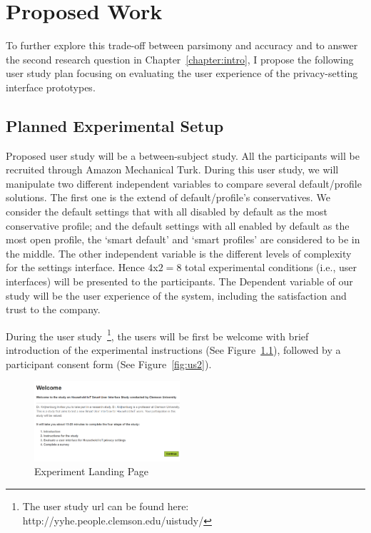 \chapter{Proposed Work}\label{chapter:evaluation}

To further explore this trade-off between parsimony and accuracy and to answer the second research question in Chapter~\ref{chapter:intro}, I propose the following user study plan focusing on evaluating the user experience of the privacy-setting interface prototypes.

\section{Planned Experimental Setup}
Proposed user study will be a between-subject study. All the participants will be recruited through Amazon Mechanical Turk. During this user study, we will manipulate two different independent variables to compare several default/profile solutions. The first one is the extend of default/profile's conservatives. We consider the default settings that with all disabled by default as the most conservative profile; and the default settings with all enabled by default as the most open profile, the `smart default' and `smart profiles' are considered to be in the middle. The other independent variable is the different levels of complexity for the settings interface. Hence $4$x$2=8$ total experimental conditions (i.e., user interfaces) will be presented to the participants. The Dependent variable of our study will be the user experience of the system, including the satisfaction and trust to the company.

During the user study~\footnote{The user study url can be found here: http://yyhe.people.clemson.edu/uistudy/}, the users will be first be welcome with brief introduction of the experimental instructions (See Figure~\ref{fig:us1}), followed by a participant consent form (See Figure~\ref{fig:us2}).

\begin{figure}
	\centering
	\includegraphics[width=0.48\textwidth]{figures/userstudy1.png}
	\caption{Experiment Landing Page}
	\label{fig:us1}
\end{figure}

